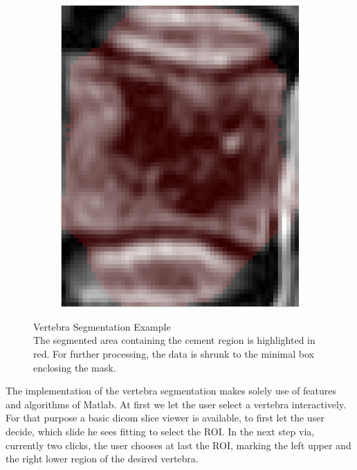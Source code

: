 \documentclass{article}
\begin{document}
{\begin{figure}[h]
\begin{subfigure}[t]{0.45\linewidth}
      \end{subfigure}
      \hfill
      \begin{subfigure}[t]{0.45\linewidth}
        \centering
        \includegraphics[scale=0.4]{VertebraSegmentationExample_2.png}
      \end{subfigure}
      \caption{Vertebra Segmentation Example\\
        The segmented area containing the cement region is highlighted in red. For further processing, the data is shrunk to the minimal box enclosing the mask.}
    \end{figure} 
    The implementation of the vertebra segmentation makes solely use of features and algorithms
    of Matlab. At first we let the user select a vertebra interactively. For that purpose a basic 
    dicom slice viewer is available, to first let the user decide, which slide he sees fitting to select the ROI. In the next step via, currently two clicks, the user chooses at last the ROI, marking the left upper and the right lower region of the desired vertebra.\\
}
\end{document}

